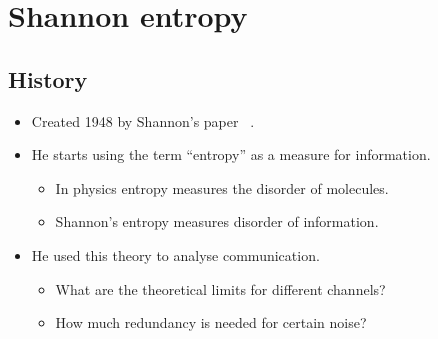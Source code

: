 


\section{Shannon entropy}

\subsection{History}

\begin{frame}
  \begin{itemize}
    \item Created 1948 by Shannon's paper 
      ~\cite{Shannon1948amt}.

      \pause{}

    \item He starts using the term \enquote{entropy} as a measure for 
      information.
      \begin{itemize}
        \item In physics entropy measures the disorder of molecules.
        \item Shannon's entropy measures disorder of information.
      \end{itemize}

      \pause{}

    \item He used this theory to analyse communication.
      \begin{itemize}
        \item What are the theoretical limits for different channels?
        \item How much redundancy is needed for certain noise?
      \end{itemize}

  \end{itemize}
\end{frame}

